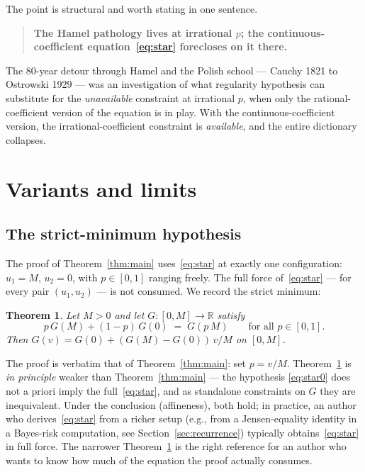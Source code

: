 \documentclass[review,12pt,a4paper]{elsarticle}
\newtheorem{theorem}{Theorem}[section]
\theoremstyle{remark}
\newcommand{\R}{\mathbb R}
\begin{document}
The point is structural and worth stating in one sentence.

\begin{quote}
\textbf{The Hamel pathology lives at irrational $p$; the continuous-coefficient equation~\eqref{eq:star} forecloses on it there.}
\end{quote}

The 80-year detour through Hamel and the Polish school --- Cauchy 1821 to
Ostrowski 1929 --- was an investigation of what regularity hypothesis can
substitute for the \emph{unavailable} constraint at irrational $p$, when
only the rational-coefficient version of the equation is in play. With the
continuous-coefficient version, the irrational-coefficient constraint is
\emph{available}, and the entire dictionary collapses.

\section{Variants and limits}
\label{sec:variants}

\subsection{The strict-minimum hypothesis}
\label{ssec:weak}

The proof of Theorem~\ref{thm:main} uses~\eqref{eq:star} at exactly one
configuration: $u_1=M$, $u_2=0$, with $p\in[0,1]$ ranging freely. The full
force of~\eqref{eq:star} --- for every pair $(u_1,u_2)$ --- is not
consumed. We record the strict minimum:

\begin{theorem}\label{thm:weak}
Let $M>0$ and let $G\colon[0,M]\to\R$ satisfy
\[
p\,G(M) + (1-p)\,G(0) \;=\; G(p\,M) \qquad \text{for all } p\in[0,1].
\]
Then $G(v)=G(0)+(G(M)-G(0))\,v/M$ on $[0,M]$.
\end{theorem}

The proof is verbatim that of Theorem~\ref{thm:main}: set $p=v/M$.
Theorem~\ref{thm:weak} is \emph{in principle} weaker than
Theorem~\ref{thm:main} --- the hypothesis \eqref{eq:star0} does not a
priori imply the full~\eqref{eq:star}, and as standalone constraints on
$G$ they are inequivalent. Under the conclusion (affineness), both hold;
in practice, an author who derives~\eqref{eq:star} from a richer setup
(e.g., from a Jensen-equality identity in a Bayes-risk computation, see
Section~\ref{sec:recurrence}) typically obtains~\eqref{eq:star} in full
force. The narrower Theorem~\ref{thm:weak} is the right reference for an
author who wants to know how much of the equation the proof actually
consumes.
\end{document}
